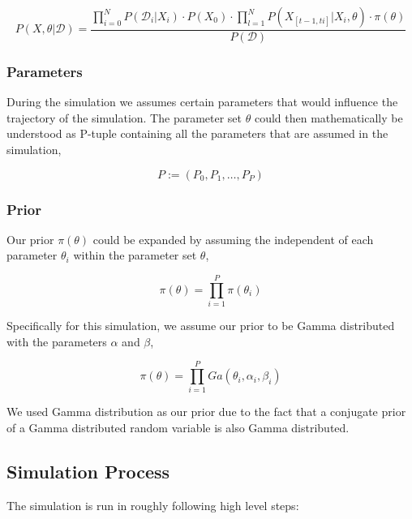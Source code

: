 \documentclass[12pt, oneside]{article}
\begin{document}
$$
P(X, \theta | \mathcal{D}) = \frac{\prod_{i=0}^{N} P(\mathcal{D}_i | X_i) \cdot P(X_0) \cdot \prod_{l=1}^{N} P(X_{[t-1, ti]} | X_i, \theta) \cdot \pi(\theta)}{P(\mathcal{D})}
$$

\subsubsection{Parameters}

During the simulation we assumes certain parameters that would influence the trajectory of the simulation. The parameter set $\theta$ could then mathematically be understood as P-tuple containing all the parameters that are assumed in the simulation,

$$P := (P_0, P_1, \dots , P_P)$$


\subsubsection{Prior}

Our prior $\pi(\theta)$ could be expanded by assuming the independent of each parameter $\theta_i$ within the parameter set $\theta$,

$$\pi(\theta) = \prod_{i=1}^{P} \pi(\theta_i)$$

Specifically for this simulation, we assume our prior to be Gamma distributed with the parameters $\alpha$ and $\beta$,

$$\pi(\theta) = \prod_{i=1}^{P} Ga(\theta_i, \alpha_i, \beta_i)$$

We used Gamma distribution as our prior due to the fact that a conjugate prior of a Gamma distributed random variable is also Gamma distributed.

\subsection{Simulation Process}

The simulation is run in roughly following high level steps:
\end{document}
